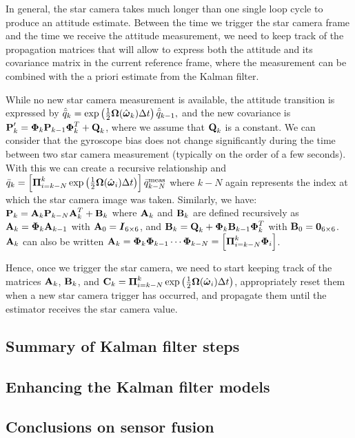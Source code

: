 In general, the star camera takes much longer than one single loop cycle to produce an attitude estimate. Between the time we trigger the star camera frame and the time we receive the attitude measurement, we need to keep track of the propagation matrices that will allow to express both the attitude and its covariance matrix in the current reference frame, where the measurement can be combined with the a priori estimate from the Kalman filter.

While no new star camera measurement is available, the attitude transition is expressed by $\hat{\bar{q}}_{k} = \exp\left(\frac{1}{2}\boldsymbol\Omega(\hat{\boldsymbol\omega}_{k})\Delta t\right)\hat{\bar{q}}_{k-1},$ and the new covariance is $\textrm{\textbf{P}}'_{k}  =  \boldsymbol{\Phi}_k \textrm{\textbf{P}}_{k-1}\boldsymbol{\Phi}^T_k + \textrm{\textbf{Q}}_k$, where we assume that $\textrm{\textbf{Q}}_k$ is a constant. We can consider that the gyroscope bias does not change significantly during the time between two star camera measurement (typically on the order of a few seconds). With this we can create a recursive relationship and $\bar{q}_{k} = \left[\boldsymbol\Pi_{i=k-N}^k\exp\left(\frac{1}{2}\boldsymbol\Omega(\hat{\boldsymbol\omega}_{i})\Delta t\right)\right]\bar{q}^{\textrm{meas}}_{k-N}$ where $k-N$ again represents the index at which the star camera image was taken. Similarly, we have: $\textrm{\textbf{P}}_{k} = \textrm{\textbf{A}}_k\textrm{\textbf{P}}_{k-N}\textrm{\textbf{A}}_k^T + \textrm{\textbf{B}}_k$ where $\textrm{\textbf{A}}_k$ and $\textrm{\textbf{B}}_k$ are defined recursively as $\textrm{\textbf{A}}_k = \boldsymbol{\Phi}_{k}\textrm{\textbf{A}}_{k-1}$ with $\textrm{\textbf{A}}_0 = \boldsymbol{I}_{6\times 6}$, and $\textrm{\textbf{B}}_k = \textrm{\textbf{Q}}_k + \boldsymbol{\Phi}_{k}\textrm{\textbf{B}}_{k-1}\boldsymbol{\Phi}_{k}^T$ with $\textrm{\textbf{B}}_0 = \boldsymbol{0}_{6\times 6}$. $\textrm{\textbf{A}}_k$ can also be written  $\textrm{\textbf{A}}_k = \boldsymbol{\Phi}_{k}\boldsymbol{\Phi}_{k-1}\cdots\boldsymbol{\Phi}_{k-N} = \left[\boldsymbol\Pi_{i=k-N}^k\boldsymbol{\Phi}_{i}\right]$.

Hence, once we trigger the star camera, we need to start keeping track of the matrices $\textrm{\textbf{A}}_k$, $\textrm{\textbf{B}}_k$, and $\textrm{\textbf{C}}_k = \boldsymbol\Pi_{i=k-N}^k\exp\left(\frac{1}{2}\boldsymbol\Omega(\hat{\boldsymbol\omega}_{i})\Delta t\right)$, appropriately reset them when a new star camera trigger has occurred, and propagate them until the estimator receives the star camera value.

\subsection{Summary of Kalman filter steps}



\subsection{Enhancing the Kalman filter models}
\label{subsec:enhancedKalman}

\subsection{Conclusions on sensor fusion}